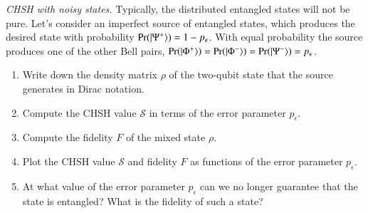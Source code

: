 \begin{exercise}
\emph{CHSH with noisy states.} Typically, the distributed entangled states will not be pure. Let's consider an imperfect source of entangled states, which produces the desired state \ket{\Psi^+} with probability $\operatorname{Pr}(\left| \Psi^+ \right\rangle)=1-p_{\epsilon}$. With equal probability the source produces one of the other Bell pairs, $\operatorname{Pr}(\left| \Phi^+ \right\rangle)=\operatorname{Pr}(\left| \Phi^- \right\rangle)=\operatorname{Pr}(\left| \Psi^- \right\rangle)=p_{\epsilon}$.
\begin{enumerate}[label=(\alph*)]
    \item Write down the density matrix $\rho$ of the two-qubit state that the source generates in Dirac notation.
    \item Compute the CHSH value $\mathcal{S}$ in terms of the error parameter $p_{\epsilon}$.
    \item Compute the fidelity $F$ of the mixed state $\rho$.
    \item Plot the CHSH value $\mathcal{S}$ and fidelity $F$ as functions of the error parameter $p_{\epsilon}$.
    \item At what value of the error parameter $p_{\epsilon}$ can we no longer guarantee that the state is entangled? What is the fidelity of such a state?
\end{enumerate}
\end{exercise}
